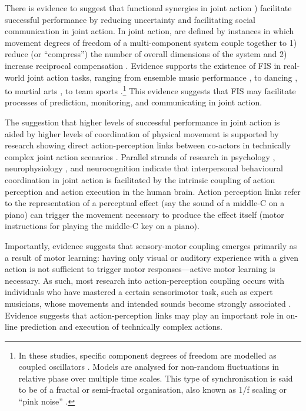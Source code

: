 \begin{CJK}{UTF8}{gbsn}
There is evidence to suggest that functional synergies in joint action \citep[``functional interpersonal synergies,'' hereafter FIS;][]{Riley2011}) facilitate successful performance by reducing uncertainty and facilitating social communication in joint action.  In joint action,  are defined by instances in which movement degrees of freedom of a multi-component system couple together to 1) reduce (or ``compress'') the number of overall dimensions of the system and 2) increase reciprocal compensation \citep[the ability of one component of a synergy to react to changes in others; see][]{Riley2011}. Evidence supports the existence of FIS in real-world joint action tasks, ranging from ensemble music performance \citep{Keller2012,Miyata2017}, to dancing \citep{Chauvigne2017}, to martial arts \citep{Schmidt2012}, to team sports \citep{Duarte2012,Passos2014}.\footnote{In these studies, specific component degrees of freedom are modelled as coupled oscillators \citep[using the HKB model, which describes the change in the relative phase between two oscillatory components.  See][]{Haken1985,Kelso1986}.  Models are analysed for non-random fluctuations in relative phase over multiple time scales.  This type of synchronisation is said to be of a fractal or semi-fractal organisation, also known as 1/f scaling or ``pink noise'' \citep{Caron2017}.} This evidence suggests that FIS may facilitate processes of prediction, monitoring, and communicating in joint action.

The suggestion that higher levels of successful performance in joint action is aided by higher levels of coordination of physical movement is supported by research showing direct action-perception links between co-actors in technically complex joint action scenarios \citep{Novembre2014}.  Parallel strands of research in psychology \citep{Prinz1990,Prinz1997,Prinz2013}, neurophysiology \citep{Rizzolatti2004,Rizzolatti2010}, and neurocognition \citep{Wolpert1998,Wolpert2000} indicate that interpersonal behavioural coordination in joint action is facilitated by the intrinsic coupling of action perception and action execution in the human brain.  Action perception links refer to the representation of a perceptual effect (say the sound of a middle-C on a piano) can trigger the movement necessary to produce the effect itself (motor instructions for playing the middle-C key on a piano).

Importantly, evidence suggests that sensory-motor coupling emerges primarily as a result of motor learning: having only visual \citep{Candidi2014} or auditory \citep{Lahav2007} experience with a given action is not sufficient to trigger motor responses---active motor learning is necessary.  As such, most research into action-perception coupling occurs with individuals who have mastered a certain sensorimotor task, such as expert musicians, whose movements and intended sounds become strongly associated \citep{Novembre2014}.  Evidence suggests that action-perception links may play an important role in on-line prediction \citep{Maidhof2009,Ruiz2009} and execution \citep{Drost2005a,Keller2010} of technically complex actions.


\end{CJK}
